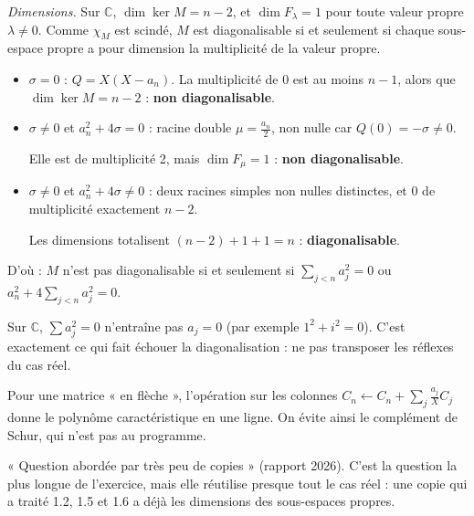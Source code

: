 \documentclass[11pt,a4paper]{article}
\begin{document}
\emph{Dimensions.} Sur \(\mathbb C\), \(\dim\ker M=n-2\), et \(\dim F_\lambda=1\) pour toute valeur propre \(\lambda\ne0\). Comme \(\chi_M\) est scindé, \(M\) est diagonalisable si et seulement si chaque sous-espace propre a pour dimension la multiplicité de la valeur propre.

\begin{itemize}
\item
  \(\sigma=0\) : \(Q=X(X-a_n)\). La multiplicité de \(0\) est au moins \(n-1\), alors que \(\dim\ker M=n-2\) : \textbf{non diagonalisable}.
\item
  \(\sigma\ne0\) et \(a_n^2+4\sigma=0\) : racine double \(\mu=\frac{a_n}2\), non nulle car \(Q(0)=-\sigma\ne0\).

  Elle est de multiplicité 2, mais \(\dim F_\mu=1\) : \textbf{non diagonalisable}.
\item
  \(\sigma\ne0\) et \(a_n^2+4\sigma\ne0\) : deux racines simples non nulles distinctes, et \(0\) de multiplicité exactement \(n-2\).

  Les dimensions totalisent \((n-2)+1+1=n\) : \textbf{diagonalisable}.
\end{itemize}

D'où : \(M\) n'est pas diagonalisable si et seulement si \(\sum_{j<n}a_j^2=0\) ou \(a_n^2+4\sum_{j<n}a_j^2=0\).

\begin{piege}

Sur \(\mathbb C\), \(\sum a_j^2=0\) n'entraîne pas \(a_j=0\) (par exemple \(1^2+i^2=0\)). C'est exactement ce qui fait échouer la diagonalisation : ne pas transposer les réflexes du cas réel.

\end{piege}

\begin{methode}

Pour une matrice « en flèche », l'opération sur les colonnes \(C_n\leftarrow C_n+\sum_j\frac{a_j}XC_j\) donne le polynôme caractéristique en une ligne. On évite ainsi le complément de Schur, qui n'est pas au programme.

\end{methode}

\begin{jury}

« Question abordée par très peu de copies » (rapport 2026). C'est la question la plus longue de l'exercice, mais elle réutilise presque tout le cas réel : une copie qui a traité 1.2, 1.5 et 1.6 a déjà les dimensions des sous-espaces propres.

\end{jury}
\end{document}
